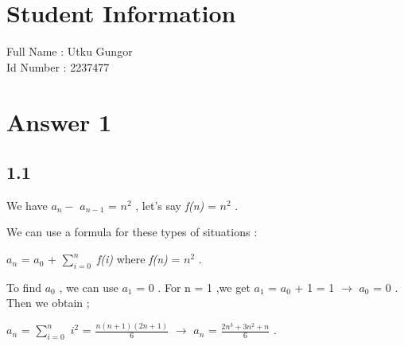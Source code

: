 \documentclass[12pt]{article}
\begin{document}
\section*{Student Information } 
Full Name : Utku Gungor \\
Id Number : 2237477 \\

\section*{Answer 1}

\subsection*{1.1}
\hspace{15px} We have \textit{$a_n-$} \textit{$a_{n-1}$} = \textit{$n^2$} , let's say \textit{f(n)} = \textit{$n^2$} . \par
We can use a formula for these types of situations : \\ \par  
\textit{$a_n$} = \textit{$a_0$} + $\sum_{i=0}^{n}$ \textit{f(i)} where  \textit{f(n)} = \textit{$n^2$} .\\ \par 
To find \textit{$a_0$} , we can use \textit{$a_1$} = 0 . For n = 1 ,we get \textit{$a_1$} = \textit{$a_0$} + 1 = 1 $\rightarrow$ \textit{$a_0$} = 0 . Then we obtain ; \par 
\textit{$a_n$} = $\sum_{i=0}^{n}$ \textit{$i^2$} = $\frac{n(n+1)(2n+1)}{6}$ $\rightarrow$ \textit{$a_n$} = $\frac{\textit{$2n^3$}+\textit{$3n^2$}+n}{6}$ .
\end{document}
